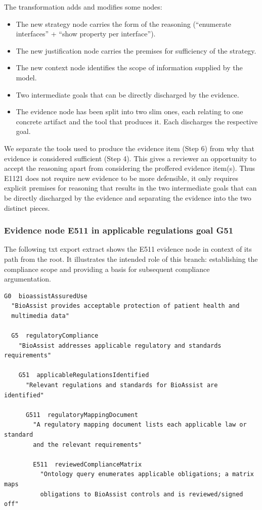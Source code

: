 \documentclass{article}
\begin{document}
The transformation adds and modifies some nodes:
\begin{itemize}
    \item The new strategy node carries the form of the reasoning (``enumerate interfaces'' + ``show property per interface'').
    \item The new justification node carries the premises for sufficiency of the strategy.
    \item The new context node identifies the scope of information supplied by the model.
    \item Two intermediate goals that can be directly discharged by the evidence.
    \item The evidence node has been split into two slim ones, each relating to one concrete artifact and the tool that produces it. Each discharges the respective goal.
\end{itemize}

We separate the tools used to produce the evidence item (Step 6) from why that evidence is considered sufficient (Step 4).
This gives a reviewer an opportunity to accept the reasoning apart from considering the proffered evidence item(s).
Thus E1121 does not require new evidence to be more defensible, it only requires explicit premises for reasoning that results in the two intermediate goals that can be directly discharged by the evidence and separating the evidence into the two distinct pieces.


\subsubsection{Evidence node E511 in applicable regulations goal G51 }
The following txt export extract shows the E511 evidence node in context of its path from the root. It illustrates the intended role of this branch: establishing the compliance scope and providing a basis for subsequent compliance argumentation.

\begin{Verbatim}[commandchars=\\\{\}]
G0  bioassistAssuredUse
  "BioAssist provides acceptable protection of patient health and
  multimedia data"

  G5  regulatoryCompliance
    "BioAssist addresses applicable regulatory and standards requirements"

    G51  applicableRegulationsIdentified
      "Relevant regulations and standards for BioAssist are identified"

      G511  regulatoryMappingDocument
        "A regulatory mapping document lists each applicable law or standard
        and the relevant requirements"

        E511  reviewedComplianceMatrix
          "Ontology query enumerates applicable obligations; a matrix maps
          obligations to BioAssist controls and is reviewed/signed off"
\end{Verbatim}
\end{document}
